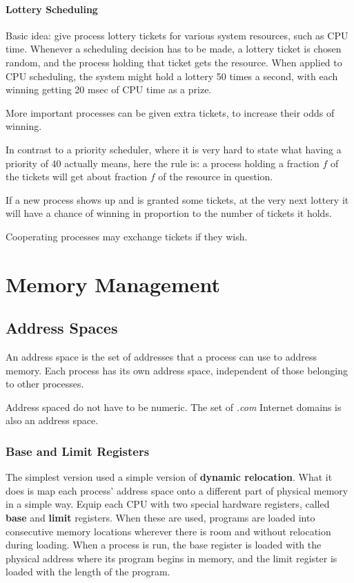 \documentclass[11pt,a4paper]{article}
\begin{document}
\paragraph{Lottery Scheduling}
Basic idea: give process lottery tickets for various system resources, such as CPU time. Whenever a scheduling decision has to be made, a lottery ticket is chosen random, and the process holding that ticket gets the resource. When applied to CPU scheduling, the system might hold a lottery 50 times a second, with each winning getting 20 msec of CPU time as a prize. 

More important processes can be given extra tickets, to increase their odds of winning.

In contrast to a priority scheduler, where it is very hard to state what having a priority of 40 actually means, here the rule is: a process holding a fraction $f$ of the tickets will get about fraction $f$ of the resource in question.

If a new process shows up and is granted some tickets, at the very next lottery it will have a chance of winning in proportion to the number of tickets it holds. 

Cooperating processes may exchange tickets if they wish.

\section{Memory Management}
\subsection{Address Spaces}
An address space is the set of addresses that a process can use to address memory. Each process has its own address space, independent of those belonging to other processes. 

Address spaced do not have to be numeric. The set of \textit{.com} Internet domains is also an address space.

\subsubsection{Base and Limit Registers}
The simplest version used a simple version of \textbf{dynamic relocation}. What it does is map each process' address space onto a different part of physical memory in a simple way. Equip each CPU with two special hardware registers, called \textbf{base} and \textbf{limit} registers. When these are used, programs are loaded into consecutive memory locations wherever there is room and without relocation during loading. When a process is run, the base register is loaded with the physical address where its program begins in memory, and the limit register is loaded with the length of the program. 
\end{document}
